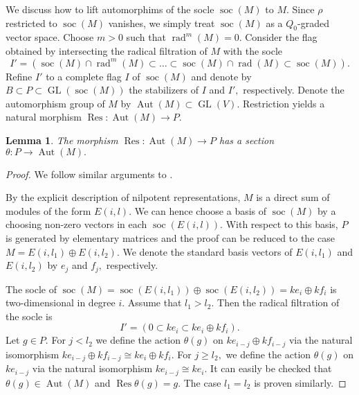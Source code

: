 \documentclass{amsart}
\theoremstyle{plain}
\newtheorem{lemma}[theorem]{Lemma}
\theoremstyle{TheoremNum}
\theoremstyle{definition}
\theoremstyle{remark}
\numberwithin{equation}{section}
\newcommand{\GL}{\operatorname{GL}}
\newcommand{\soc}{\operatorname{soc}}
\newcommand{\rad}{\operatorname{rad}}
\newcommand{\Aut}{\operatorname{Aut}}
\newcommand{\Res}{\operatorname{Res}}
\begin{document}
We discuss how to lift automorphims of the socle $\soc(M)$ to $M.$
Since $\rho$ restricted to $\soc(M)$ vanishes, we simply treat $\soc(M)$ as a $Q_0$-graded vector space. Choose $m>0$ such that $\rad^m(M)=0.$ Consider the flag obtained by intersecting the radical filtration of $M$ with the socle
$$I'=(\soc(M)\cap\rad^m(M)\subset\dots\subset\soc(M)\cap\rad(M)\subset \soc(M)).$$
Refine $I'$ to a complete flag $I$ of $\soc(M)$ and denote by $B\subset P\subset \GL(\soc(M))$ the stabilizers of $I$ and $I',$ respectively.
Denote the automorphism group of $M$ by $\Aut(M)\subset\GL(V).$ Restriction yields a natural morphism $\Res:\Aut(M)\to P.$
\begin{lemma} The morphism $\Res:\Aut(M)\to P$ has a section $\theta:P\to\Aut(M).$ 
\end{lemma}
\begin{proof}
We follow similar arguments to \cite[Lemma 1]{sauter_cell_2016}.

By the explicit description of nilpotent representations, $M$ is a direct sum of modules of the form $E(i,l).$ We can hence choose a basis of $\soc(M)$ by a choosing non-zero vectors in each $\soc(E(i,l)).$ With respect to this basis, $P$ is generated by elementary matrices and the proof can be reduced to the case $M=E(i,l_1)\oplus E(i,l_2).$ We denote the standard basis vectors of $E(i,l_1)$ and $E(i,l_2)$ by $e_j$ and $f_j,$ respectively. 

The socle of $\soc(M)=\soc(E(i,l_1))\oplus \soc(E(i,l_2))=ke_i\oplus kf_i$ is two-dimensional in degree $i.$ Assume that $l_1>l_2.$ Then the radical filtration of the socle is 
$$I'=(0\subset ke_i\subset ke_i\oplus kf_i).$$
Let $g\in P.$ For $j< l_2$ we define the action $\theta(g)$ on $ke_{i-j}\oplus kf_{i-j}$ via the natural isomorphism $ke_{i-j}\oplus kf_{i-j}\cong ke_i\oplus kf_i.$ For $j\geq l_2,$ we define the action $\theta(g)$ on $ke_{i-j}$ via the natural isomorphism $ke_{i-j}\cong ke_i.$ It can easily be checked that $\theta(g)\in \Aut(M)$ and $\Res\theta(g)=g.$ The case $l_1=l_2$ is proven similarly.
\end{proof}
\end{document}
